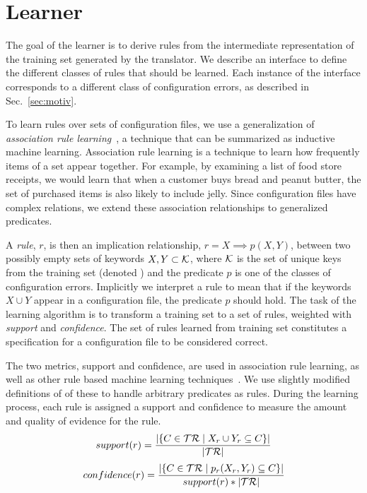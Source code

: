 \section{Learner}
\label{sec-learn}

The goal of the learner is to derive rules from the intermediate representation of the training set generated by the translator.
We describe an interface to define the different classes of rules that should be learned.
Each instance of the interface corresponds to a different class of configuration errors, as described in Sec.~\ref{sec:motiv}.

To learn rules over sets of configuration files, we use a generalization of \textit{association rule learning}~\cite{agrawal1993mining}, a technique that can be summarized as inductive machine learning.
Association rule learning is a technique to learn how frequently items of a set appear together.
For example, by examining a list of food store receipts, we would learn that when a customer buys bread and peanut butter, the set of purchased items is also likely to include jelly.
Since configuration files have complex relations, we extend these association relationships to generalized predicates.

A \textit{rule}, $r$, is then an implication relationship, $r = X \implies p(X,Y)$, between two possibly empty sets of keywords $X,Y \subset \mathcal{K}$, where $\mathcal{K}$ is the set of unique keys from the training set (denoted \trainingSet) and the predicate $p$ is one of the classes of configuration errors.
Implicitly we interpret a rule to mean that if the keywords $X\cup Y$ appear in a configuration file, the predicate $p$ should hold.
The task of the learning algorithm is to transform a training set to a set of rules, weighted with \textit{support} and \textit{confidence}.
The set of rules learned from training set \trainingSet constitutes a specification for a configuration file to be considered correct.

The two metrics, support and confidence, are used in association rule learning, as well as other rule based machine learning techniques~\cite{han2007frequent,langley1995applications}.
We use slightly modified definitions of of these to handle arbitrary predicates as rules.
During the learning process, each rule is assigned a support and confidence to measure the amount and quality of evidence for the rule.
%
\begin{equation*}
 support(r) = \frac{|\{C \in \mathcal{TR} \mid X_r \cup Y_r \subseteq C\}|} {|\mathcal{TR}|}
\end{equation*}
\begin{equation*}
 confidence(r) = \frac{|\{C \in \mathcal{TR} \mid p_r(X_r,Y_r) \subseteq C\}| } {support(r)*|\mathcal{TR}|}
\end{equation*}

